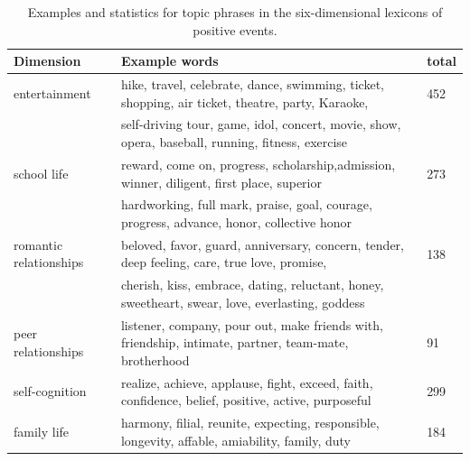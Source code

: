 \begin{table}
\centering
\caption{\small{Examples and statistics for topic phrases in the six-dimensional lexicons of positive events.}}
\label{tab:topicWords}
\small{
\begin{tabular}{lll}
\toprule
Dimension & Example words & total \\ \midrule
entertainment  & hike, travel, celebrate, dance, swimming, ticket, shopping, air ticket, theatre, party, Karaoke,& 452\\
                      & self-driving tour, game, idol, concert, movie, show, opera, baseball, running, fitness, exercise & \\
school life    & reward, come on, progress, scholarship,admission, winner, diligent, first place, superior & 273\\
				      & hardworking, full mark,  praise, goal, courage, progress, advance, honor, collective honor& \\
romantic  relationships&  beloved, favor, guard, anniversary,  concern, tender, deep feeling, care, true love, promise, & 138\\
				      & cherish, kiss, embrace, dating, reluctant, honey, sweetheart, swear, love, everlasting, goddess &\\
peer relationships  & listener, company, pour out, make friends with, friendship, intimate, partner, team-mate, brotherhood& 91\\
self-cognition & realize, achieve, applause, fight, exceed, faith, confidence, belief, positive, active, purposeful & 299\\
family life    & harmony, filial, reunite, expecting, responsible, longevity, affable, amiability, family, duty & 184\\
\bottomrule
\end{tabular}}
\end{table}

